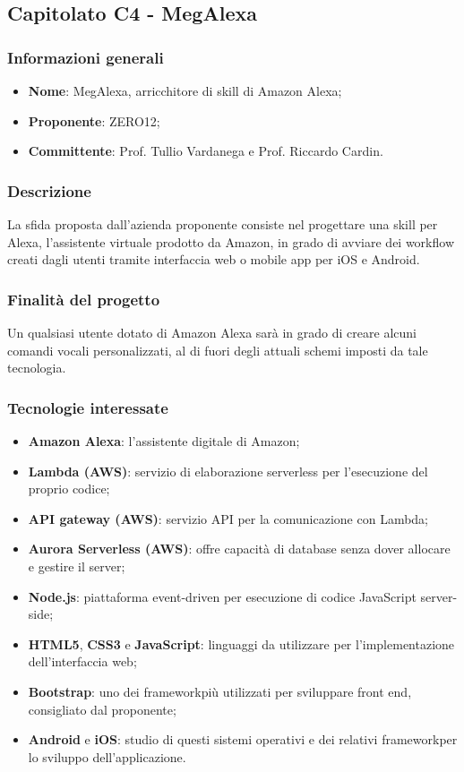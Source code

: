 \subsection{Capitolato C4 - MegAlexa}
\subsubsection{Informazioni generali}
\begin{itemize}
    \item \textbf{Nome}: MegAlexa, arricchitore di skill\glo{} di Amazon Alexa;
	\item \textbf{Proponente}: ZERO12; 
	\item \textbf{Committente}: Prof. Tullio Vardanega e Prof. Riccardo Cardin.
\end{itemize}
\subsubsection{Descrizione}
La sfida proposta dall'azienda proponente consiste nel progettare una skill\glo{} per 
Alexa, l'assistente virtuale prodotto da Amazon,
in grado di avviare dei workflow\glo{} creati dagli utenti tramite interfaccia web o
mobile app per iOS e Android.

\subsubsection{Finalità del progetto}
Un qualsiasi utente dotato di Amazon Alexa sarà in grado di creare alcuni comandi vocali personalizzati, al di fuori degli attuali schemi imposti da tale tecnologia. 
\subsubsection{Tecnologie interessate}
\begin{itemize}
    \item \textbf{Amazon Alexa}: l'assistente digitale di Amazon;
    \item \textbf{Lambda (AWS\glo)}: servizio di elaborazione serverless per 
l'esecuzione del proprio codice;
    \item \textbf{API gateway (AWS\glo)}: servizio API per la comunicazione con 
Lambda;
    \item \textbf{Aurora Serverless (AWS\glo)}: offre capacità di database senza 
dover allocare e gestire il server;
    \item \textbf{Node.js\glo}: piattaforma event-driven\glo{} per esecuzione di codice 
JavaScript server-side\glo;
    \item \textbf{HTML5}, \textbf{CSS3} e \textbf{JavaScript}: linguaggi da 
utilizzare per l'implementazione
    dell'interfaccia web;
    \item \textbf{Bootstrap}: uno dei framework\glosp più utilizzati per sviluppare front end\glo, consigliato dal proponente;
	\item \textbf{Android} e \textbf{iOS}: studio di questi sistemi operativi e 
	dei relativi framework\glosp per lo sviluppo dell'applicazione. 

\end{itemize}
